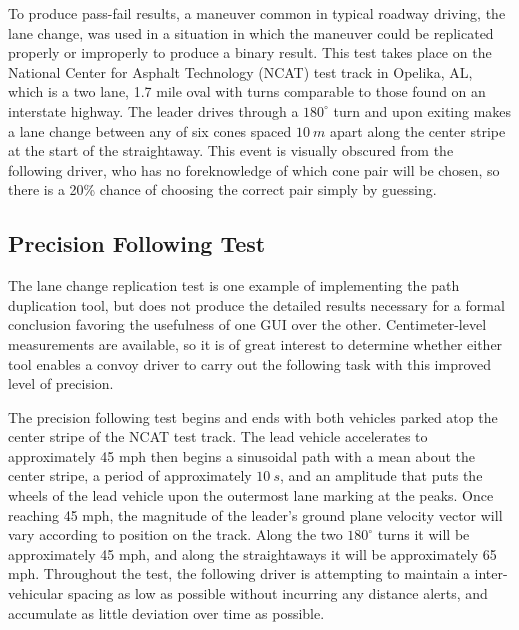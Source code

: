 \documentclass[twocolumn,10pt]{article}
\begin{document}
    To produce pass-fail results, a maneuver common in typical roadway driving, the lane change, was used in a situation in which the maneuver could be replicated properly or improperly to produce a binary result.  This test takes place on the National Center for Asphalt Technology (NCAT) test track in Opelika, AL, which is a two lane, 1.7 mile oval with turns comparable to those found on an interstate highway.  The leader drives through a $180^{\circ}$ turn and upon exiting makes a lane change between any of six cones spaced $10~m$ apart along the center stripe at the start of the straightaway.  This event is visually obscured from the following driver, who has no foreknowledge of which cone pair will be chosen, so there is a 20\% chance of choosing the correct pair simply by guessing.

  \subsection*{Precision Following Test}

    The lane change replication test is one example of implementing the path duplication tool, but does not produce the detailed results necessary for a formal conclusion favoring the usefulness of one GUI over the other.  Centimeter-level measurements are available, so it is of great interest to determine whether either tool enables a convoy driver to carry out the following task with this improved level of precision.
    
    The precision following test begins and ends with both vehicles parked atop the center stripe of the NCAT test track.  The lead vehicle accelerates to approximately 45 mph then begins a sinusoidal path with a mean about the center stripe, a period of approximately $10~s$, and an amplitude that puts the wheels of the lead vehicle upon the outermost lane marking at the peaks.  Once reaching 45 mph, the magnitude of the leader’s ground plane velocity vector will vary according to position on the track.  Along the two $180^{\circ}$ turns it will be approximately 45 mph, and along the straightaways it will be approximately 65 mph.  Throughout the test, the following driver is attempting to maintain a inter-vehicular spacing as low as possible without incurring any distance alerts, and accumulate as little deviation over time as possible.
    
\end{document}
